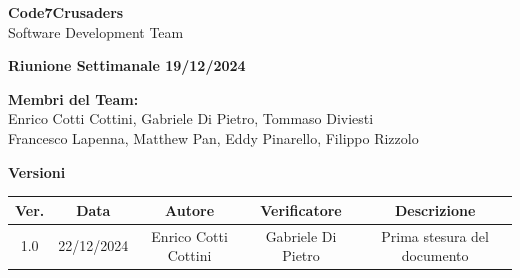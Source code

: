 \documentclass{article}
\begin{document}
\begin{titlepage}
    {\Huge \textbf{Code7Crusaders}}\\
    \vspace{0.5cm}
    {\Large Software Development Team}\\
    \vspace{2cm}
        
        {\large \textbf{Riunione Settimanale 19/12/2024}}\\
    \vspace{5cm}                           %
    
    
    \textbf{Membri del Team:}\\
    Enrico Cotti Cottini, Gabriele Di Pietro, Tommaso Diviesti \\
    Francesco Lapenna, Matthew Pan, Eddy Pinarello, Filippo Rizzolo \\
    \vspace{0.5cm}
    
    \vspace{1cm}
\end{titlepage}



\newpage
\begin{table}[h!]
\centering
\textbf{Versioni} \\ %
\vspace{2mm} %
\begin{tabular}{|c|c|c|c|c|}
    \hline
    \textbf{Ver.} & \textbf{Data} & \textbf{Autore} & \textbf{Verificatore} & \textbf{Descrizione} \\
    \hline
    1.0 & 22/12/2024 & Enrico Cotti Cottini & Gabriele Di Pietro & Prima stesura del documento \\ 
    \hline                                  %
\end{tabular}
\end{table}



\newpage
\tableofcontents
\end{document}
